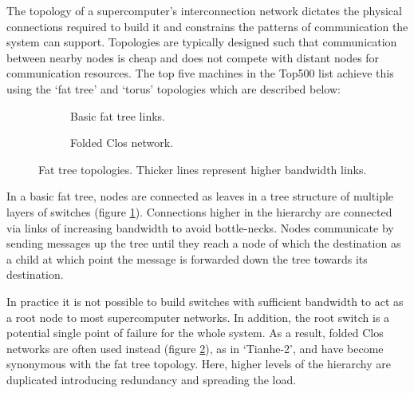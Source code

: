 				
				The topology of a supercomputer's interconnection network dictates the
				physical connections required to build it and constrains the patterns of
				communication the system can support. Topologies are typically designed
				such that communication between nearby nodes is cheap and does not
				compete with distant nodes for communication resources. The top five
				machines in the Top500 list achieve this using the `fat tree' and
				`torus' topologies which are described below:
				
				\begin{figure}
					\begin{subfigure}[t]{\textwidth}
						\center
						
						\caption{Basic fat tree links.}
						\label{fig:fat-tree-concept}
					\end{subfigure}
					
					\vspace{1.5em}
					
					\begin{subfigure}[t]{\textwidth}
						\center
						
						\caption{Folded Clos network.}
						\label{fig:fat-tree-clos}
					\end{subfigure}
					
					\caption[Fat tree topologies.]{Fat tree topologies. Thicker lines
					represent higher bandwidth links.}
					\label{fig:fat-tree}
				\end{figure}
				
				\label{sec:fat-tree}
				
				In a basic fat tree, nodes are connected as leaves in a tree structure
				of multiple layers of switches (figure \ref{fig:fat-tree-concept}).
				Connections higher in the hierarchy are connected via links of
				increasing bandwidth to avoid bottle-necks.  Nodes communicate by
				sending messages up the tree until they reach a node of which the
				destination as a child at which point the message is forwarded down the
				tree towards its destination.
				
				In practice it is not possible to build switches with sufficient
				bandwidth to act as a root node to most supercomputer networks. In
				addition, the root switch is a potential single point of failure for the
				whole system. As a result, folded Clos networks \cite{clos53} are often used instead
				(figure \ref{fig:fat-tree-clos}), as in `Tianhe-2', and have become
				synonymous with the fat tree topology. Here, higher levels of the
				hierarchy are duplicated introducing redundancy and spreading the load.
				
